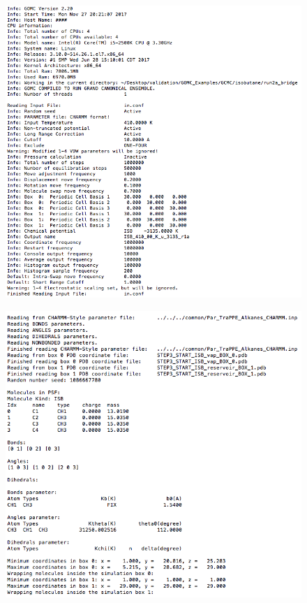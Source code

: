 \begin{figure}[H]
\includegraphics[scale=0.7]{images/out1}
\end{figure}
\begin{figure}[H]
\includegraphics[scale=0.7]{images/out2}
\end{figure}
